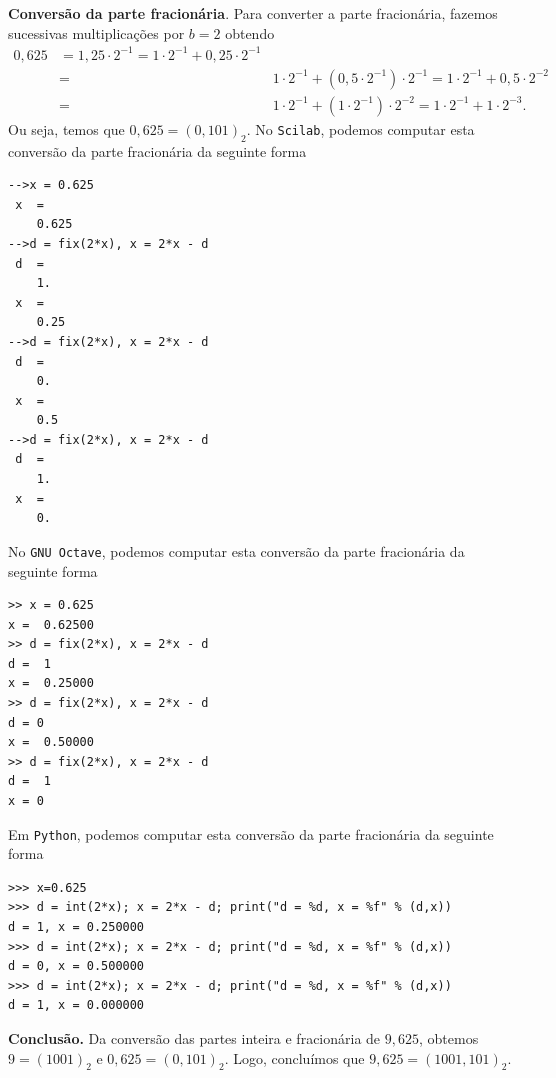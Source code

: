 \begin{ex}
{\bf Conversão da parte fracionária}. Para converter a parte fracionária, fazemos sucessivas multiplicações por $b=2$ obtendo
\begin{eqnarray*}
  0,625 &= 1,25\cdot 2^{-1} = 1\cdot 2^{-1} + 0,25\cdot 2^{-1}\\
  &=& 1\cdot 2^{-1} + (0,5\cdot 2^{-1})\cdot 2^{-1} = 1\cdot 2^{-1} + 0,5\cdot 2^{-2}\\
  &=& 1\cdot 2^{-1} + (1\cdot 2^{-1})\cdot 2^{-2} = 1\cdot 2^{-1} + 1\cdot 2^{-3}.
\end{eqnarray*}
Ou seja, temos que $0,625 = (0,101)_2$.
\ifisscilab
No \verb+Scilab+, podemos computar esta conversão da parte fracionária da seguinte forma
\begin{verbatim}
-->x = 0.625
 x  =
    0.625  
-->d = fix(2*x), x = 2*x - d
 d  =
    1.  
 x  =
    0.25  
-->d = fix(2*x), x = 2*x - d
 d  =
    0.  
 x  =
    0.5  
-->d = fix(2*x), x = 2*x - d
 d  =
    1.  
 x  =
    0.  
\end{verbatim}
\fi
\ifisoctave
No \verb+GNU Octave+, podemos computar esta conversão da parte fracionária da seguinte forma
\begin{verbatim}
>> x = 0.625
x =  0.62500
>> d = fix(2*x), x = 2*x - d
d =  1
x =  0.25000
>> d = fix(2*x), x = 2*x - d
d = 0
x =  0.50000
>> d = fix(2*x), x = 2*x - d
d =  1
x = 0
\end{verbatim}
\fi
\ifispython
Em \verb+Python+, podemos computar esta conversão da parte fracionária da seguinte forma
\begin{verbatim}
>>> x=0.625
>>> d = int(2*x); x = 2*x - d; print("d = %d, x = %f" % (d,x))
d = 1, x = 0.250000
>>> d = int(2*x); x = 2*x - d; print("d = %d, x = %f" % (d,x))
d = 0, x = 0.500000
>>> d = int(2*x); x = 2*x - d; print("d = %d, x = %f" % (d,x))
d = 1, x = 0.000000
\end{verbatim}
\fi

{\bf Conclusão.} Da conversão das partes inteira e fracionária de $9,625$, obtemos $9 = (1001)_2$ e $0,625 = (0,101)_2$. Logo, concluímos que $9,625 = (1001,101)_2$.
\end{ex}

